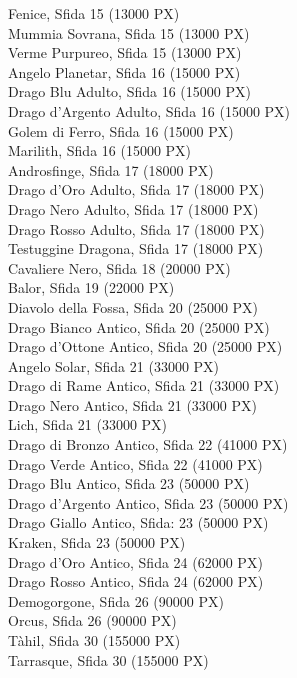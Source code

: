 \begin{multicols}{3}
{		Fenice, Sfida 15 (13000 PX)\\
		Mummia Sovrana, Sfida 15 (13000 PX)\\
		Verme Purpureo, Sfida 15 (13000 PX)\\
		Angelo Planetar, Sfida 16 (15000 PX)\\
		Drago Blu Adulto, Sfida 16 (15000 PX)\\
		Drago d'Argento Adulto, Sfida 16 (15000 PX)\\
		Golem di Ferro, Sfida 16 (15000 PX)\\
		Marilith, Sfida 16 (15000 PX)\\
		Androsfinge, Sfida 17 (18000 PX)\\
		Drago d'Oro Adulto, Sfida 17 (18000 PX)\\
		Drago Nero Adulto, Sfida 17 (18000 PX)\\
		Drago Rosso Adulto, Sfida 17 (18000 PX)\\
		Testuggine Dragona, Sfida 17 (18000 PX)\\
		Cavaliere Nero, Sfida 18 (20000 PX)\\
		Balor, Sfida 19 (22000 PX)\\
		Diavolo della Fossa, Sfida 20 (25000 PX)\\
		Drago Bianco Antico, Sfida 20 (25000 PX)\\
		Drago d'Ottone Antico, Sfida 20 (25000 PX)\\
		Angelo Solar, Sfida 21 (33000 PX)\\
		Drago di Rame Antico, Sfida 21 (33000 PX)\\
		Drago Nero Antico, Sfida 21 (33000 PX)\\
		Lich, Sfida 21 (33000 PX)\\
		Drago di Bronzo Antico, Sfida 22 (41000 PX)\\
		Drago Verde Antico, Sfida 22 (41000 PX)\\
		Drago Blu Antico, Sfida 23 (50000 PX)\\
		Drago d'Argento Antico, Sfida 23 (50000 PX)\\
		Drago Giallo Antico, Sfida: 23 (50000 PX)\\
		Kraken, Sfida 23 (50000 PX)\\
		Drago d'Oro Antico, Sfida 24 (62000 PX)\\
		Drago Rosso Antico, Sfida 24 (62000 PX)\\
		Demogorgone, Sfida 26 (90000 PX)\\
		Orcus, Sfida 26 (90000 PX)\\
		Tàhil, Sfida 30 (155000 PX)\\
		Tarrasque, Sfida 30 (155000 PX)\\
	}

\end{multicols}